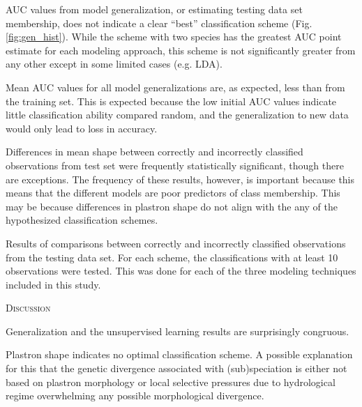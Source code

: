 \documentclass[12pt,letterpaper]{article}
\renewcommand{\section}[1]{%
\bigskip
\begin{center}
\begin{Large}
\normalfont\scshape #1
\medskip
\end{Large}
\end{center}}
\begin{document}
AUC values from model generalization, or estimating testing data set membership, does not indicate a clear ``best'' classification scheme (Fig. \ref{fig:gen_hist}). While the scheme with two species has the greatest AUC point estimate for each modeling approach, this scheme is not significantly greater from any other except in some limited cases (e.g. LDA). 

Mean AUC values for all model generalizations are, as expected, less than from the training set. This is expected because the low initial AUC values indicate little classification ability compared random, and the generalization to new data would only lead to loss in accuracy.


Differences in mean shape between correctly and incorrectly classified observations from test set were frequently statistically significant, though there are exceptions. The frequency of these results, however, is important because this means that the different models are poor predictors of class membership. This may be because differences in plastron shape do not align with the any of the hypothesized classification schemes.

\begin{table}
  \begin{scriptsize}
    
    
    
    
    
  \end{scriptsize}
  \caption{Results of comparisons between correctly and incorrectly classified observations from the testing data set. For each scheme, the classifications with at least 10 observations were tested. This was done for each of the three modeling techniques included in this study.}
  \label{tab:miss_tests}
\end{table}

\section{Discussion}

Generalization and the unsupervised learning results are surprisingly congruous.

Plastron shape indicates no optimal classification scheme. A possible explanation for this that the genetic divergence associated with (sub)speciation is either not based on plastron morphology or local selective pressures due to hydrological regime overwhelming any possible morphological divergence.
\end{document}

